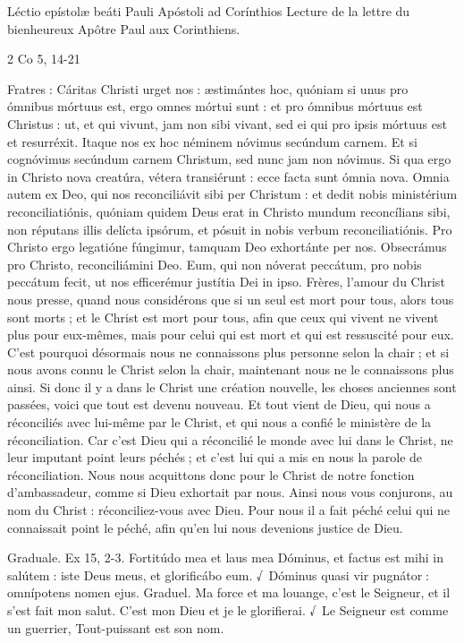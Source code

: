\begin{paracol}{2}
Léctio epístolæ beáti Pauli Apóstoli ad Corínthios
\switchcolumn
Lecture de la lettre du bienheureux Apôtre Paul aux Corinthiens.
\switchcolumn*

2 Co 5, 14-21
\switchcolumn

\switchcolumn*

Fratres : Cáritas Christi urget nos :  æstimántes hoc, quóniam si unus pro ómnibus mórtuus est, ergo omnes mórtui sunt : et pro ómnibus mórtuus est Christus : ut, et qui vivunt, jam non sibi vivant, sed ei qui pro ipsis mórtuus est et resurréxit. Itaque nos ex hoc néminem nóvimus secúndum carnem. Et si cognóvimus secúndum carnem Christum, sed nunc jam non nóvimus. Si qua ergo in Christo nova creatúra, vétera transiérunt : ecce facta sunt ómnia nova. Omnia autem ex Deo, qui nos reconciliávit sibi per Christum : et dedit nobis ministérium reconciliatiónis, quóniam quidem Deus erat in Christo mundum reconcílians sibi, non réputans illis delícta ipsórum, et pósuit in nobis verbum reconciliatiónis. Pro Christo ergo legatióne fúngimur, tamquam Deo exhortánte per nos. Obsecrámus pro Christo, reconciliámini Deo. Eum, qui non nóverat peccátum, pro nobis peccátum fecit, ut nos efficerémur justítia Dei in ipso.
\switchcolumn
Frères, l’amour du Christ nous presse, quand nous considérons que si un seul est mort pour tous, alors tous sont morts ; et le Christ est mort pour tous, afin que ceux qui vivent ne vivent plus pour eux-mêmes, mais pour celui qui est mort et qui est ressuscité pour eux. C’est pourquoi désormais nous ne connaissons plus personne selon la chair ; et si nous avons connu le Christ selon la chair, maintenant nous ne le connaissons plus ainsi. Si donc il y a dans le Christ une création nouvelle, les choses anciennes sont passées, voici que tout est devenu nouveau. Et tout vient de Dieu, qui nous a réconciliés avec lui-même par le Christ, et qui nous a confié le ministère de la réconciliation. Car c’est Dieu qui a réconcilié le monde avec lui dans le Christ, ne leur imputant point leurs péchés ; et c’est lui qui a mis en nous la parole de réconciliation. Nous nous acquittons donc pour le Christ de notre fonction d’ambassadeur, comme si Dieu exhortait par nous. Ainsi nous vous conjurons, au nom du Christ : réconciliez-vous avec Dieu. Pour nous il a fait péché celui qui ne connaissait point le péché, afin qu’en lui nous devenions justice de Dieu.
\switchcolumn*

Graduale. Ex 15, 2-3. Fortitúdo mea et laus mea Dóminus, et factus est mihi in salútem : iste Deus meus, et glorificábo eum. √~Dóminus quasi vir pugnátor : omnípotens nomen ejus.
\switchcolumn
Graduel. Ma force et ma louange, c’est le Seigneur, et il s’est fait mon salut. C’est mon Dieu et je le glorifierai. √~Le Seigneur est comme un guerrier, Tout-puissant est son nom.
\switchcolumn*


\end{paracol}
